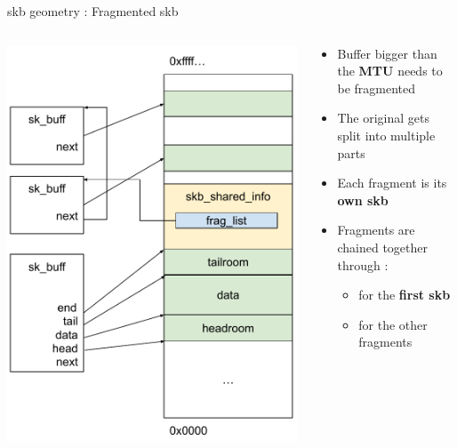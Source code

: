\begin{frame}{skb geometry : Fragmented skb}
	\begin{columns}
		\begin{column}{0.3\textwidth}
			\includegraphics[width=\textwidth]{slides/networking-skb/fragmented_skb.pdf}
		\end{column}
		\begin{column}{0.7\textwidth}
			\begin{itemize}
				\item Buffer bigger than the \textbf{MTU} needs to be fragmented
				\item The original  gets split into multiple parts
				\item Each fragment is its \textbf{own skb}
				\item Fragments are chained together through :
					\begin{itemize}
						\item {} for the \textbf{first skb}
						\item {} for the other fragments
					\end{itemize}
			\end{itemize}
		\end{column}
	\end{columns}
\end{frame}


